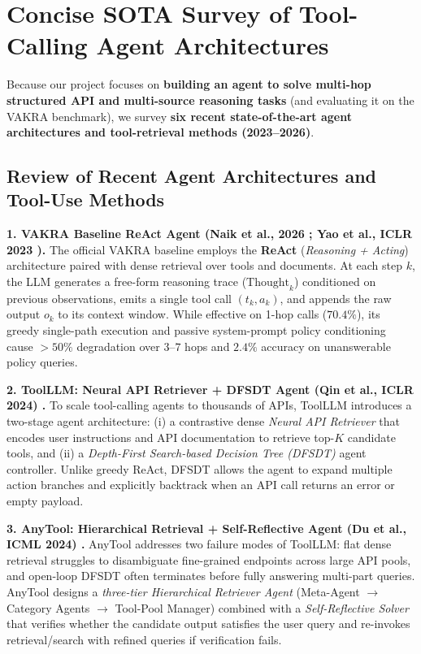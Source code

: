 \documentclass[10pt]{article}
\begin{document}
\newpage
\section{Concise SOTA Survey of Tool-Calling Agent Architectures}

Because our project focuses on \textbf{building an agent to solve multi-hop structured API and multi-source reasoning tasks} (and evaluating it on the VAKRA benchmark), we survey \textbf{six recent state-of-the-art agent architectures and tool-retrieval methods (2023--2026)}.

\subsection{Review of Recent Agent Architectures and Tool-Use Methods}

\textbf{1. VAKRA Baseline ReAct Agent (Naik et al., 2026 \cite{naik2026vakra}; Yao et al., ICLR 2023 \cite{yao2023react}).}
The official VAKRA baseline employs the \textbf{ReAct} (\textit{Reasoning + Acting}) architecture paired with dense retrieval over tools and documents. At each step $k$, the LLM generates a free-form reasoning trace ($\text{Thought}_k$) conditioned on previous observations, emits a single tool call $(t_k, a_k)$, and appends the raw output $o_k$ to its context window. While effective on 1-hop calls ($70.4\%$), its greedy single-path execution and passive system-prompt policy conditioning cause $>50\%$ degradation over $3\text{--}7$ hops and $2.4\%$ accuracy on unanswerable policy queries.

\textbf{2. ToolLLM: Neural API Retriever + DFSDT Agent (Qin et al., ICLR 2024) \cite{qin2024toolllm}.}
To scale tool-calling agents to thousands of APIs, ToolLLM introduces a two-stage agent architecture: (i) a contrastive dense \textit{Neural API Retriever} that encodes user instructions and API documentation to retrieve top-$K$ candidate tools, and (ii) a \textit{Depth-First Search-based Decision Tree (DFSDT)} agent controller. Unlike greedy ReAct, DFSDT allows the agent to expand multiple action branches and explicitly backtrack when an API call returns an error or empty payload.

\textbf{3. AnyTool: Hierarchical Retrieval + Self-Reflective Agent (Du et al., ICML 2024) \cite{du2024anytool}.}
AnyTool addresses two failure modes of ToolLLM: flat dense retrieval struggles to disambiguate fine-grained endpoints across large API pools, and open-loop DFSDT often terminates before fully answering multi-part queries. AnyTool designs a \textit{three-tier Hierarchical Retriever Agent} (Meta-Agent $\rightarrow$ Category Agents $\rightarrow$ Tool-Pool Manager) combined with a \textit{Self-Reflective Solver} that verifies whether the candidate output satisfies the user query and re-invokes retrieval/search with refined queries if verification fails.
\end{document}
